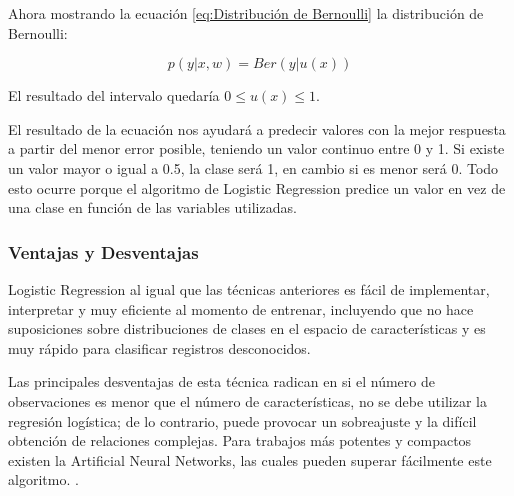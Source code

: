 \par Ahora mostrando la ecuación \ref{eq:Distribución de Bernoulli} la distribución de Bernoulli:\\
\begin{Large}
	\begin{equation}
		p(y|x,w) = Ber(y|u(x))
		\label{eq:Distribución de Bernoulli}
	\end{equation}
\end{Large}
\begin{center}
	El resultado del intervalo quedaría $0 \leq u(x) \leq 1$.\\
\end{center}
\par El resultado de la ecuación nos ayudará a predecir valores con la mejor respuesta a partir del menor error posible, teniendo un valor continuo entre 0 y 1. Si existe un valor mayor o igual a 0.5, la clase será 1, en cambio si es menor será 0. Todo esto ocurre porque el algoritmo de Logistic Regression predice un valor en vez de una clase en función de las variables utilizadas.\\

\doublespacing
\subsubsection{Ventajas y Desventajas}
Logistic Regression al igual que las técnicas anteriores es fácil de implementar, interpretar y muy eficiente al momento de entrenar, incluyendo que no hace suposiciones sobre distribuciones de clases en el espacio de características y es muy rápido para clasificar registros desconocidos.\\
\par Las principales desventajas de esta técnica radican en si el número de observaciones es menor que el número de características, no se debe utilizar la regresión logística; de lo contrario, puede provocar un sobreajuste y la difícil obtención de relaciones complejas.  Para trabajos más potentes y compactos existen la Artificial Neural Networks, las cuales pueden superar fácilmente este algoritmo. \cite{Harrington2012}. \\


\doublespacing
